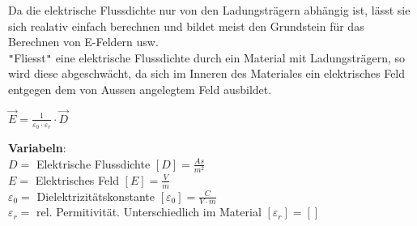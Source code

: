 \newpage

Da die elektrische Flussdichte nur von den Ladungsträgern abhängig ist, lässt sie sich realativ einfach berechnen und bildet meist den Grundstein für
das Berechnen von E-Feldern usw. \\
\texttt{"}Fliesst\texttt{"} eine elektrische Flussdichte durch ein Material mit Ladungsträgern, so wird diese abgeschwächt, da sich im Inneren des Materiales ein
elektrisches Feld entgegen dem von Aussen angelegtem Feld ausbildet. \\
\begin{center}
\end{center}

\begingl
\begin{center}
	\formulaBegin
	$ \vec{E} = \frac{1}{\varepsilon_0 \cdot \varepsilon_r} \cdot \vec{D}$
	\formulaEnd
\end{center}
\textbf{Variabeln}: \\
$D = $ Elektrische Flussdichte $ [D] = \frac{As}{m^2}$ \\
$ E = $ Elektrisches Feld $[E] = \frac{V}{m}$ \\
$ \varepsilon_0 = $ Dielektrizitätskonstante $ [\varepsilon_0] = \frac{C}{V\cdot m}$ \\
$ \varepsilon_r = $ rel. Permitivität. Unterschiedlich im Material $ [\varepsilon_r] = [ ]$ \\

\iend


\newpage


